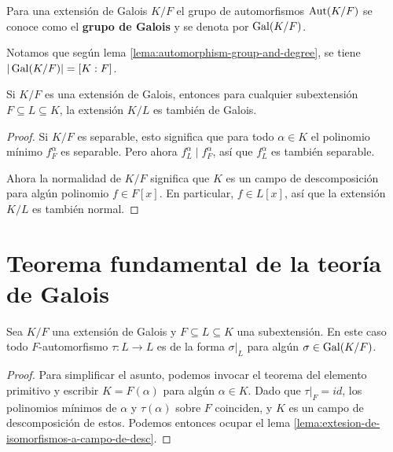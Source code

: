 \begin{definicion}
  Para una extensión de Galois $K/F$ el grupo de automorfismos $\operatorname{Aut} (K/F)$ se
  conoce como el \textbf{grupo de Galois} y se denota por $\operatorname{Gal} (K/F)$.
\end{definicion}

Notamos que según lema \ref{lema:automorphism-group-and-degree}, se tiene
$|\operatorname{Gal} (K/F)| = [K : F]$.

\begin{lema}
  Si $K/F$ es una extensión de Galois, entonces para cualquier subextensión
  $F \subseteq L \subseteq K$, la extensión $K/L$ es también de Galois.

  \begin{proof}
    Si $K/F$ es separable, esto significa que para todo $\alpha \in K$ el
    polinomio mínimo $f^\alpha_F$ es separable. Pero ahora
    $f^\alpha_L \mid f^\alpha_F$, así que $f^\alpha_L$ es también separable.

    Ahora la normalidad de $K/F$ significa que $K$ es un campo de descomposición
    para algún polinomio $f \in F [x]$. En particular, $f \in L [x]$, así que
    la extensión $K/L$ es también normal.
  \end{proof}
\end{lema}


\section{Teorema fundamental de la teoría de Galois}

\begin{lema}
  Sea $K/F$ una extensión de Galois y $F \subseteq L \subseteq K$
  una subextensión. En este caso todo $F$-automorfismo
  $\tau\colon L\to L$ es de la forma $\left.\sigma\right|_L$
  para algún $\sigma \in \operatorname{Gal} (K/F)$.

  \begin{proof}
    Para simplificar el asunto, podemos invocar el teorema del elemento
    primitivo y escribir $K = F (\alpha)$ para algún $\alpha \in K$. Dado que
    $\left.\tau\right|_F = id$, los polinomios mínimos de $\alpha$ y
    $\tau (\alpha)$ sobre $F$ coinciden, y $K$ es un campo de descomposición de
    estos. Podemos entonces ocupar el lema
    \ref{lema:extesion-de-isomorfismos-a-campo-de-desc}.
  \end{proof}
\end{lema}

